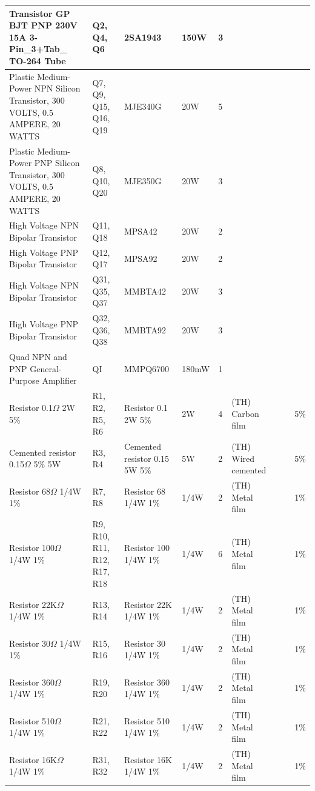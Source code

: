 \begin{table}[h!]
{\begin{tabular}{|l|l|l|l|l|l|l|l|l|}
	Transistor GP BJT PNP 230V 15A 3-Pin\_3+Tab\_ TO-264 Tube & Q2, Q4, Q6 & 2SA1943 & 150W & 3 &  &  &  &  \\ \hline
	Plastic Medium-Power NPN Silicon Transistor, 300 VOLTS, 0.5 AMPERE, 20 WATTS & Q7, Q9, Q15, Q16, Q19 & MJE340G & 20W & 5 &  &  &  &  \\ \hline
	Plastic Medium-Power PNP Silicon Transistor, 300 VOLTS, 0.5 AMPERE, 20 WATTS & Q8, Q10, Q20 & MJE350G & 20W & 3 &  &  &  &  \\ \hline
	High Voltage NPN Bipolar Transistor & Q11, Q18 & MPSA42 & 20W & 2 &  &  &  &  \\ \hline
	High Voltage PNP Bipolar Transistor & Q12, Q17 & MPSA92 & 20W & 2 &  &  &  &  \\ \hline
	High Voltage NPN Bipolar Transistor & Q31, Q35, Q37 & MMBTA42 & 20W & 3 &  &  &  &  \\ \hline
	High Voltage PNP Bipolar Transistor & Q32, Q36, Q38 & MMBTA92 & 20W & 3 &  &  &  &  \\ \hline
	Quad NPN and PNP General-Purpose Amplifier & QI & MMPQ6700 & 180mW & 1 &  &  &  &  \\ \hline
	Resistor 0.1$\Omega$ 2W 5\% & R1, R2, R5, R6 & Resistor 0.1 2W 5\% & 2W & 4 & (TH) Carbon film &  &  & 5\% \\ \hline
	Cemented resistor 0.15$\Omega$ 5\% 5W & R3, R4 & Cemented resistor 0.15 5W 5\% & 5W & 2 & (TH) Wired cemented &  &  & 5\% \\ \hline
	Resistor 68$\Omega$ 1/4W 1\% & R7, R8 & Resistor 68 1/4W 1\% & 1/4W & 2 & (TH) Metal film &  &  & 1\% \\ \hline
	Resistor 100$\Omega$ 1/4W 1\% & R9, R10, R11, R12, R17, R18 & Resistor 100 1/4W 1\% & 1/4W & 6 & (TH) Metal film &  &  & 1\% \\ \hline
	Resistor 22K$\Omega$ 1/4W 1\% & R13, R14 & Resistor 22K 1/4W 1\% & 1/4W & 2 & (TH) Metal film &  &  & 1\% \\ \hline
	Resistor 30$\Omega$ 1/4W 1\% & R15, R16 & Resistor 30 1/4W 1\% & 1/4W & 2 & (TH) Metal film &  &  & 1\% \\ \hline
	Resistor 360$\Omega$ 1/4W 1\% & R19, R20 & Resistor 360 1/4W 1\% & 1/4W & 2 & (TH) Metal film &  &  & 1\% \\ \hline
	Resistor 510$\Omega$ 1/4W 1\% & R21, R22 & Resistor 510 1/4W 1\% & 1/4W & 2 & (TH) Metal film &  &  & 1\% \\ \hline
	Resistor 16K$\Omega$ 1/4W 1\% & R31, R32 & Resistor 16K 1/4W 1\% & 1/4W & 2 & (TH) Metal film &  &  & 1\% \\ \hline

\end{tabular}}
\end{table}
